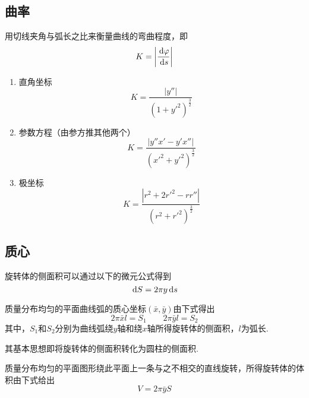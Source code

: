 \subsection{曲率}
\begin{definition}[曲率]
用切线夹角与弧长之比来衡量曲线的弯曲程度，即
\[K=\left|\dfrac{\,\mathrm{d}\varphi}{\,\mathrm{d} s}\right|\]
\end{definition}
\begin{enumerate}
	\item 直角坐标
	\[K=\dfrac{|y''|}{(1+y'^2)^\frac{3}{2}}\]
	\item 参数方程（由参方推其他两个）
	\[K=\dfrac{|y''x'-y'x''|}{(x'^2+y'^2)^\frac{3}{2}}\]
	\item 极坐标
	\[K=\dfrac{|r^2+2r'^2-rr''|}{(r^2+r'^2)^\frac{3}{2}}\]
\end{enumerate}

\subsection{质心}
旋转体的侧面积可以通过以下的微元公式得到
\[\,\mathrm{d} S=2\pi y\,\mathrm{d} s\]
\begin{theorem}
质量分布均匀的平面曲线弧的质心坐标$(\bar{x},\bar{y})$由下式得出
\[2\pi\bar{x}l=S_1\qquad 2\pi\bar{y}l=S_2\]
其中，$S_1$和$S_2$分别为曲线弧绕$y$轴和绕$x$轴所得旋转体的侧面积，$l$为弧长.
\end{theorem}
其基本思想即将旋转体的侧面积转化为圆柱的侧面积.
\begin{theorem}[古鲁金第二定理]
质量分布均匀的平面图形绕此平面上一条与之不相交的直线旋转，所得旋转体的体积由下式给出
\[V=2\pi\bar{y}S\]
\end{theorem}